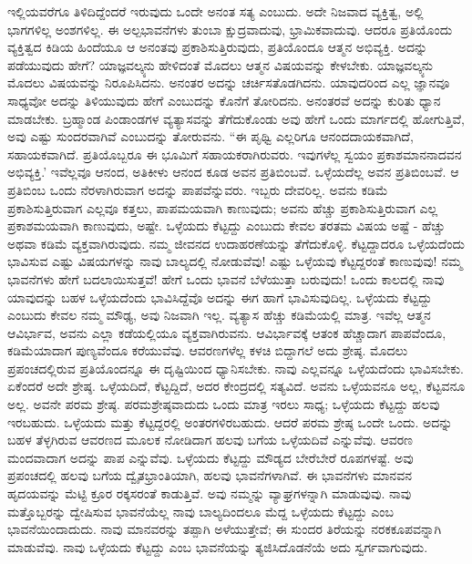 ಇಲ್ಲಿಯವರೆಗೂ ತಿಳಿದಿದ್ದೆಂದರೆ ಇರುವುದು ಒಂದೇ ಅನಂತ ಸತ್ಯ ಎಂಬುದು. ಅದೇ ನಿಜವಾದ ವ್ಯಕ್ತಿತ್ವ, ಅಲ್ಲಿ ಭಾಗಗಳಿಲ್ಲ ಅಂಶಗಳಿಲ್ಲ. ಈ ಅಲ್ಪಭಾವನೆಗಳು ತುಂಬಾ ಕ್ಷುದ್ರವಾದುವು, ಭ್ರಾಮಿಕವಾದುವು. ಆದರೂ ಪ್ರತಿಯೊಂದು ವ್ಯಕ್ತಿತ್ವದ ಕಿಡಿಯ ಹಿಂದೆಯೂ ಆ ಅನಂತವು ಪ್ರಕಾಶಿಸುತ್ತಿರುವುದು, ಪ್ರತಿಯೊಂದೂ ಆತ್ಮನ ಅಭಿವ್ಯಕ್ತಿ. ಅದನ್ನು ಪಡೆಯುವುದು ಹೇಗೆ? ಯಾಜ್ಞವಲ್ಕ್ಯನು ಹೇಳಿದಂತೆ ಮೊದಲು ಆತ್ಮನ ವಿಷಯವನ್ನು ಕೇಳಬೇಕು. ಯಾಜ್ಞವಲ್ಕ್ಯನು ಮೊದಲು ವಿಷಯವನ್ನು ನಿರೂಪಿಸಿದನು. ಅನಂತರ ಅದನ್ನು ಚರ್ಚಿಸತೊಡಗಿದನು. ಯಾವುದರಿಂದ ಎಲ್ಲ ಜ್ಞಾನವೂ ಸಾಧ್ಯವೋ ಅದನ್ನು ತಿಳಿಯುವುದು ಹೇಗೆ ಎಂಬುದನ್ನು ಕೊನೆಗೆ ತೋರಿದನು. ಅನಂತರವೆ ಅದನ್ನು ಕುರಿತು ಧ್ಯಾನ ಮಾಡಬೇಕು. ಬ್ರಹ್ಮಾಂಡ ಪಿಂಡಾಂಡಗಳ ವ್ಯತ್ಯಾಸವನ್ನು ತೆಗೆದುಕೊಂಡು ಅವು ಹೇಗೆ ಒಂದು ಮಾರ್ಗದಲ್ಲಿ ಹೋಗುತ್ತಿವೆ, ಅವು ಎಷ್ಟು ಸುಂದರವಾಗಿವೆ ಎಂಬುದನ್ನು ತೋರುವನು. “ಈ ಪೃಥ್ವಿ ಎಲ್ಲರಿಗೂ ಆನಂದದಾಯಕವಾಗಿದೆ, ಸಹಾಯಕವಾಗಿದೆ. ಪ್ರತಿಯೊಬ್ಬರೂ ಈ ಭೂಮಿಗೆ ಸಹಾಯಕರಾಗಿರುವರು. ಇವುಗಳೆಲ್ಲ ಸ್ವಯಂ ಪ್ರಕಾಶಮಾನನಾದವನ ಅಭಿವ್ಯಕ್ತಿ.' ಇವೆಲ್ಲವೂ ಆನಂದ, ಅತಿಕೀಳು ಆನಂದ ಕೂಡ ಅವನ ಪ್ರತಿಬಿಂಬವೆ. ಒಳ್ಳೆಯದೆಲ್ಲ ಅವನ ಪ್ರತಿಬಿಂಬವೆ. ಆ ಪ್ರತಿಬಿಂಬ ಒಂದು ನೆರಳಾಗಿರುವಾಗ ಅದನ್ನು ಪಾಪವೆನ್ನುವರು. ಇಬ್ಬರು ದೇವರಿಲ್ಲ. ಅವನು ಕಡಿಮೆ ಪ್ರಕಾಶಿಸುತ್ತಿರುವಾಗ ಎಲ್ಲವೂ ಕತ್ತಲು, ಪಾಪಮಯವಾಗಿ ಕಾಣುವುದು; ಅವನು ಹೆಚ್ಚು ಪ್ರಕಾಶಿಸುತ್ತಿರುವಾಗ ಎಲ್ಲ ಪ್ರಕಾಶಮಯವಾಗಿ ಕಾಣುವುದು, ಅಷ್ಟೇ. ಒಳ್ಳೆಯದು ಕೆಟ್ಟದ್ದು ಎಂಬುದು ಕೇವಲ ತರತಮ ವಿಷಯ ಅಷ್ಟೆ - ಹೆಚ್ಚು ಅಥವಾ ಕಡಿಮೆ ವ್ಯಕ್ತವಾಗಿರುವುದು. ನಮ್ಮ ಜೀವನದ ಉದಾಹರಣೆಯನ್ನು ತೆಗೆದುಕೊಳ್ಳಿ. ಕೆಟ್ಟದ್ದಾದರೂ ಒಳ್ಳೆಯದೆಂದು ಭಾವಿಸುವ ಎಷ್ಟು ವಿಷಯಗಳನ್ನು ನಾವು ಬಾಲ್ಯದಲ್ಲಿ ನೋಡುವೆವು! ಎಷ್ಟು ಒಳ್ಳೆಯವು ಕೆಟ್ಟದ್ದರಂತೆ ಕಾಣುವುವು! ನಮ್ಮ ಭಾವನೆಗಳು ಹೇಗೆ ಬದಲಾಯಿಸುತ್ತವೆ! ಹೇಗೆ ಒಂದು ಭಾವನೆ ಬೆಳೆಯುತ್ತಾ ಬರುವುದು! ಒಂದು ಕಾಲದಲ್ಲಿ ನಾವು ಯಾವುದನ್ನು ಬಹಳ ಒಳ್ಳೆಯದೆಂದು ಭಾವಿಸಿದ್ದೆವೊ ಅದನ್ನು ಈಗ ಹಾಗೆ ಭಾವಿಸುವುದಿಲ್ಲ. ಒಳ್ಳೆಯದು ಕೆಟ್ಟದ್ದು ಎಂಬುದು ಕೇವಲ ನಮ್ಮ ಮೌಢ್ಯ, ಅವು ನಿಜವಾಗಿ ಇಲ್ಲ. ವ್ಯತ್ಯಾಸ ಹೆಚ್ಚು ಕಡಿಮೆಯಲ್ಲಿ ಮಾತ್ರ. ಇವೆಲ್ಲ ಆತ್ಮನ ಆವಿರ್ಭಾವ, ಅವನು ಎಲ್ಲಾ ಕಡೆಯಲ್ಲಿಯೂ ವ್ಯಕ್ತವಾಗಿರುವನು. ಆವಿರ್ಭಾವಕ್ಕೆ ಆತಂಕ ಹೆಚ್ಚಾದಾಗ ಪಾಪವೆಂದೂ, ಕಡಿಮೆಯಾದಾಗ ಪುಣ್ಯವೆಂದೂ ಕರೆಯುವೆವು. ಆವರಣಗಳೆಲ್ಲ ಕಳಚಿ ಬಿದ್ದಾಗಲೆ ಅದು ಶ್ರೇಷ್ಠ. ಮೊದಲು ಪ್ರಪಂಚದಲ್ಲಿರುವ ಪ್ರತಿಯೊಂದನ್ನೂ ಈ ದೃಷ್ಟಿಯಿಂದ ಧ್ಯಾನಿಸಬೇಕು. ನಾವು ಎಲ್ಲವನ್ನೂ ಒಳ್ಳೆಯದೆಂದು ಭಾವಿಸಬೇಕು. ಏಕೆಂದರೆ ಅದೇ ಶ್ರೇಷ್ಠ. ಒಳ್ಳೆಯದಿದೆ, ಕೆಟ್ಟದ್ದಿದೆ, ಅದರ ಕೇಂದ್ರದಲ್ಲಿ ಸತ್ಯವಿದೆ. ಅವನು ಒಳ್ಳೆಯವನೂ ಅಲ್ಲ, ಕೆಟ್ಟವನೂ ಅಲ್ಲ. ಅವನೇ ಪರಮ ಶ್ರೇಷ್ಠ. ಪರಮಶ್ರೇಷ್ಠವಾದುದು ಒಂದು ಮಾತ್ರ ಇರಲು ಸಾಧ್ಯ; ಒಳ್ಳೆಯದು ಕೆಟ್ಟದ್ದು ಹಲವು ಇರಬಹುದು. ಒಳ್ಳೆಯದು ಮತ್ತು ಕೆಟ್ಟದ್ದರಲ್ಲಿ ಅಂತರಗಳಿರಬಹುದು. ಆದರೆ ಪರಮ ಶ್ರೇಷ್ಠ ಒಂದೇ ಒಂದು. ಅದನ್ನು ಬಹಳ ತೆಳ್ಳಗಿರುವ ಆವರಣದ ಮೂಲಕ ನೋಡಿದಾಗ ಹಲವು ಬಗೆಯ ಒಳ್ಳೆಯದಿವೆ ಎನ್ನುವೆವು. ಆವರಣ ಮಂದವಾದಾಗ ಅದನ್ನು ಪಾಪ ಎನ್ನುವೆವು. ಒಳ್ಳೆಯದು ಕೆಟ್ಟದ್ದು ಮೌಡ್ಯದ ಬೇರೆಬೇರೆ ರೂಪಗಳಷ್ಟೆ. ಅವು ಪ್ರಪಂಚದಲ್ಲಿ ಹಲವು ಬಗೆಯ ದ್ವೈತಭ್ರಾಂತಿಯಾಗಿ, ಹಲವು ಭಾವನೆಗಳಾಗಿವೆ. ಈ ಭಾವನೆಗಳು ಮಾನವನ ಹೃದಯವನ್ನು ಮೆಟ್ಟಿ ಕ್ರೂರ ರಕ್ಕಸರಂತೆ ಕಾಡುತ್ತಿವೆ. ಅವು ನಮ್ಮನ್ನು ವ್ಯಾಘ್ರಗಳನ್ನಾಗಿ ಮಾಡುವುವು. ನಾವು ಮತ್ತೊಬ್ಬರನ್ನು ದ್ವೇಷಿಸುವ ಭಾವನೆಯೆಲ್ಲ ನಾವು ಬಾಲ್ಯದಿಂದಲೂ ಮೆದ್ದ ಒಳ್ಳೆಯದು ಕೆಟ್ಟದ್ದು ಎಂಬ ಭಾವನೆಯಿಂದಾದುದು. ನಾವು ಮಾನವರನ್ನು ತಪ್ಪಾಗಿ ಅಳೆಯುತ್ತೇವೆ; ಈ ಸುಂದರ ತಿರೆಯನ್ನು ನರಕಕೂಪವನ್ನಾಗಿ ಮಾಡುವೆವು. ನಾವು ಒಳ್ಳೆಯದು ಕೆಟ್ಟದ್ದು ಎಂಬ ಭಾವನೆಯನ್ನು ತ್ಯಜಿಸಿದೊಡನೆಯೆ ಅದು ಸ್ವರ್ಗವಾಗುವುದು.

